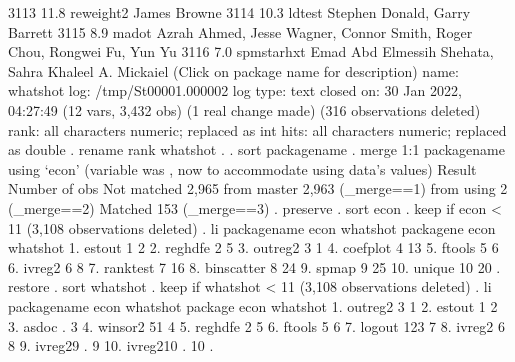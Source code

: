   3113     11.8    reweight2     James Browne                            
  3114     10.3    ldtest        Stephen Donald, Garry Barrett           
  3115      8.9    madot         Azrah Ahmed, Jesse Wagner, Connor       
                                   Smith, Roger Chou, Rongwei Fu, Yun Yu   
  3116      7.0    spmstarhxt    Emad Abd Elmessih Shehata, Sahra        
                                   Khaleel A. Mickaiel                     
  (Click on package name for description)
      name:  whatshot
       log:  /tmp/St00001.000002
  log type:  text
 closed on:  30 Jan 2022, 04:27:49
(12 vars, 3,432 obs)
(1 real change made)
(316 observations deleted)
rank: all characters numeric; replaced as int
hits: all characters numeric; replaced as double
{\smallskip}
. rename rank whatshot
{\smallskip}
. 
. sort packagename
{\smallskip}
. merge 1:1 packagename using `econ'
(variable {} was {}, now {} to accommodate using data's values)
{\smallskip}
    Result                      Number of obs
    Not matched                         2,965
        from master                     2,963  (_merge==1)
        from using                          2  (_merge==2)
{\smallskip}
    Matched                               153  (_merge==3)
{\smallskip}
. preserve
{\smallskip}
. sort econ
{\smallskip}
. keep if econ < 11
(3,108 observations deleted)
{\smallskip}
. li packagename econ whatshot
{\smallskip}
     {\TLC}
     {\VBAR} packagen{\tytilde}e   econ   whatshot {\VBAR}
     {\LFTT}
  1. {\VBAR}     estout      1          2 {\VBAR}
  2. {\VBAR}    reghdfe      2          5 {\VBAR}
  3. {\VBAR}    outreg2      3          1 {\VBAR}
  4. {\VBAR}   coefplot      4         13 {\VBAR}
  5. {\VBAR}     ftools      5          6 {\VBAR}
     {\LFTT}
  6. {\VBAR}     ivreg2      6          8 {\VBAR}
  7. {\VBAR}   ranktest      7         16 {\VBAR}
  8. {\VBAR} binscatter      8         24 {\VBAR}
  9. {\VBAR}      spmap      9         25 {\VBAR}
 10. {\VBAR}     unique     10         20 {\VBAR}
     {\BLC}
{\smallskip}
. restore
{\smallskip}
. sort whatshot
{\smallskip}
. keep if whatshot < 11
(3,108 observations deleted)
{\smallskip}
. li packagename econ whatshot
{\smallskip}
     {\TLC}
     {\VBAR} packag{\tytilde}e   econ   whatshot {\VBAR}
     {\LFTT}
  1. {\VBAR}  outreg2      3          1 {\VBAR}
  2. {\VBAR}   estout      1          2 {\VBAR}
  3. {\VBAR}    asdoc      .          3 {\VBAR}
  4. {\VBAR}  winsor2     51          4 {\VBAR}
  5. {\VBAR}  reghdfe      2          5 {\VBAR}
     {\LFTT}
  6. {\VBAR}   ftools      5          6 {\VBAR}
  7. {\VBAR}   logout    123          7 {\VBAR}
  8. {\VBAR}   ivreg2      6          8 {\VBAR}
  9. {\VBAR}  ivreg29      .          9 {\VBAR}
 10. {\VBAR} ivreg210      .         10 {\VBAR}
     {\BLC}
{\smallskip}
. 
